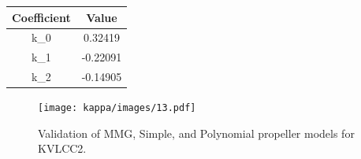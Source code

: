\vspace{0.2cm}
\begin{minipage}[c]{0.49\textwidth}
    \vspace{-0.40cm}
    \centering
    \label{tab:kt_coefficients}
    \begin{tabular}{c c}
        \toprule
        Coefficient & Value \\
        \hline
        k_0 & 0.32419 \\
        k_1 & -0.22091 \\
        k_2 & -0.14905 \\
        \bottomrule
    \end{tabular}
\end{minipage}
\hfill
\begin{minipage}[c]{0.49\textwidth}
\label{\detokenize{06.20_results_kvlcc2:kvlcc2-propeller-model}}

\end{minipage}
\vspace{-0.5cm}
\begin{figure}[!htb]
\centering
\texttt{[image: kappa/images/13.pdf]}
\caption{Validation of MMG, Simple, and Polynomial propeller models for KVLCC2.}\label{\detokenize{06.20_results_kvlcc2:fig-propeller-validation}}\end{figure}
\clearpage
